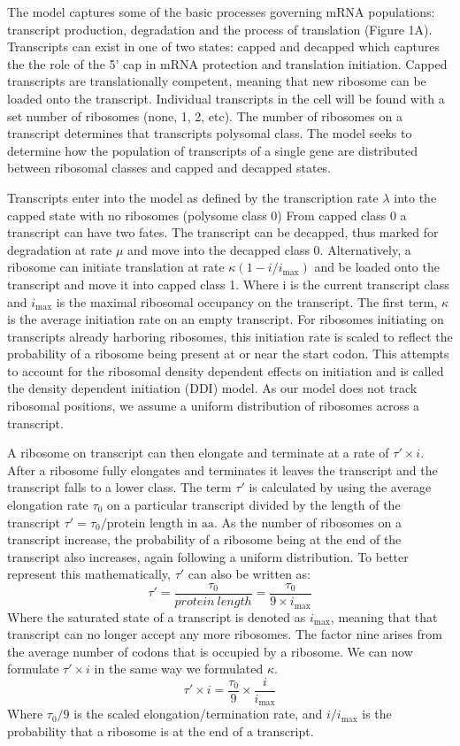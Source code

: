 \documentclass[review]{elsarticle}
\newcommand{\imax}{\ensuremath{{i_{\max}}}\xspace}
\begin{document}
The model captures some of the basic processes governing mRNA populations: transcript production, degradation and the process of translation (Figure 1A).
Transcripts can exist in one of two states: capped and decapped which captures the the role of the 5' cap in mRNA protection and translation initiation. 
Capped transcripts are translationally competent, meaning that new ribosome can be loaded onto the transcript. 
Individual transcripts in the cell will be found with a set number of ribosomes (none, 1, 2, etc).
The number of ribosomes on a transcript determines that transcripts polysomal class.
The model seeks to determine how the population of transcripts of a single gene are distributed between ribosomal classes and capped and decapped states.

Transcripts enter into the model as defined by the transcription rate $\lambda$ into the capped state with no ribosomes (polysome class 0)
From capped class 0 a transcript can have two fates. 
The transcript can be decapped, thus marked for degradation at rate $\mu$ and move into the decapped class 0.
Alternatively, a ribosome can initiate translation at rate $\kappa(1-i/\imax)$ and be loaded onto the transcript and move it into capped class 1.
Where i is the current transcript class and \imax is the maximal ribosomal occupancy on the transcript. 
The first term, $\kappa$ is the average initiation rate on an empty transcript. 
For ribosomes initiating on transcripts already harboring ribosomes, this initiation rate is scaled to reflect the probability of a ribosome being present at or near the start codon. 
This attempts to account for the ribosomal density dependent effects on initiation and is called the density dependent initiation (DDI) model.
As our model does not track ribosomal positions, we assume a uniform distribution of ribosomes across a transcript.

A ribosome on transcript can then elongate and terminate at a rate of $\tau' \times  i$. After a ribosome fully elongates and terminates it leaves the transcript and the transcript falls to a lower class.
The term $\tau'$ is calculated by using the average elongation rate $\tau_0$ on a particular transcript divided by the length of the transcript $\tau'=\tau_0/\text{protein length in aa}$.
As the number of ribosomes on a transcript increase, the probability of a ribosome being at the end of the transcript also increases, again following a uniform distribution. 
To better represent this mathematically, $\tau'$ can also  be written as:
\begin{equation}
	\tau' = \frac{\tau_0}{protein \: length} = \frac{\tau_0}{9\times \imax}
\end{equation}
Where the saturated state of a transcript is denoted as \imax, meaning that that transcript can no longer accept any more ribosomes. The factor nine arises from the average number of codons that is occupied by a ribosome. 
We can now formulate $\tau' \times i$ in the same way we formulated $\kappa$. 
\begin{equation}
	\tau' \times i = \frac{\tau_0}{9} \times \frac{i}{\imax}
\end{equation}
Where $\tau_0/9$ is the scaled elongation/termination rate, and $i/\imax$ is the probability that a ribosome is at the end of a transcript.
\end{document}
